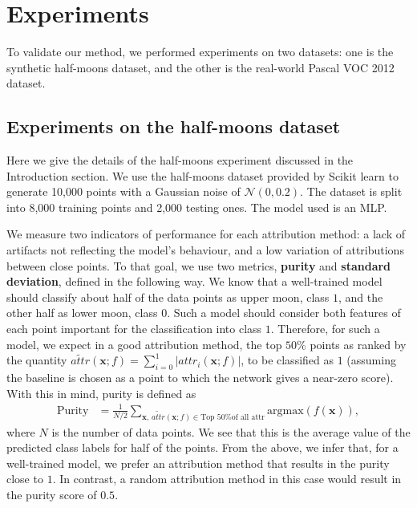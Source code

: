 \section{Experiments}
\label{sec:experiments}

To validate our method, we performed experiments on two datasets: one is the synthetic half-moons dataset, and the other is the real-world Pascal VOC 2012 dataset.

\subsection{Experiments on the half-moons dataset}
\label{subsec:half-moons}

Here we give the details of the half-moons experiment discussed in the Introduction section. We use the half-moons dataset provided by Scikit learn \citep{scikit-learn} to generate 10,000 points with a Gaussian noise of $\mathcal{N}(0, 0.2)$. The dataset is split into 8,000 training points and 2,000 testing ones. The model used is an MLP.

We measure two indicators of performance for each attribution method: a lack of artifacts not reflecting the model's behaviour, and a low variation of attributions between close points. To that goal, we use two metrics, \textbf{purity} and \textbf{standard deviation}, defined in the following way. We know that a well-trained model should classify about half of the data points as upper moon, class $1$, and the other half as lower moon, class $0$. Such a model should consider both features of each point important for the classification into class $1$. Therefore, for such a model, we expect in a good attribution method, the top $50\%$ points as ranked by the quantity $\widetilde{attr}(\textbf{x}; f) = \sum_{i=0}^1 |attr_i(\textbf{x}; f)|$, to be classified as $1$ (assuming the baseline is chosen as a point to which the network gives a near-zero score). With this in mind, purity is defined as
\begin{equation}
\begin{split}
    \textrm{Purity} &= \frac{1}{N/2}\sum_{\textbf{x}, \, \widetilde{attr}(\textbf{x}; f) \in \textrm{Top 50\% of all attr}} \textrm{argmax}(f(\textbf{x})),
\end{split}
\label{eq:moons-purity}
\end{equation}
where $N$ is the number of data points. We see that this is the average value of the predicted class labels for half of the points. From the above, we infer that, for a well-trained model, we prefer an attribution method that results in the purity close to $1$. In contrast, a random attribution method in this case would result in the purity score of $0.5$. 

